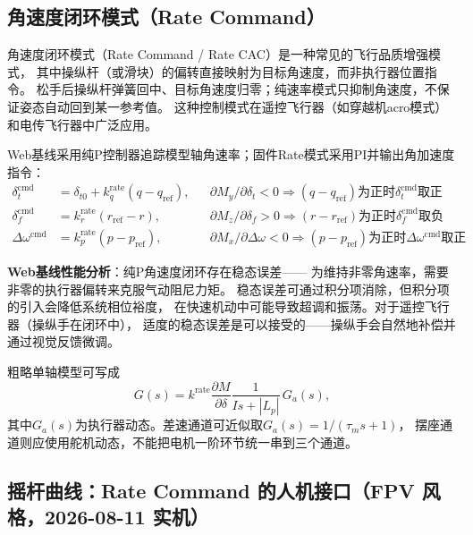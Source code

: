 \subsection{角速度闭环模式（Rate Command）}

角速度闭环模式（Rate Command / Rate CAC）是一种常见的飞行品质增强模式，
其中操纵杆（或滑块）的偏转直接映射为目标角速度，而非执行器位置指令。
松手后操纵杆弹簧回中、目标角速度归零；纯速率模式只抑制角速度，不保证姿态自动回到某一参考值。
这种控制模式在遥控飞行器（如穿越机acro模式）和电传飞行器中广泛应用。

Web基线采用纯P控制器追踪模型轴角速率；固件Rate模式采用PI并输出角加速度指令：
\begin{align}
    \delta_t^{\text{cmd}} &= \delta_{t0}+k_q^{\text{rate}} (q - q_{\text{ref}}),
    &&\partial M_y / \partial \delta_t < 0 \Rightarrow (q - q_{\text{ref}})
    \text{为正时} \delta_t^{\text{cmd}} \text{取正} \\
    \delta_f^{\text{cmd}} &= k_r^{\text{rate}} (r_{\text{ref}} - r),
    &&\partial M_z / \partial \delta_f > 0 \Rightarrow (r - r_{\text{ref}})
    \text{为正时} \delta_f^{\text{cmd}} \text{取负} \\
    \Delta\omega^{\text{cmd}} &= k_p^{\text{rate}} (p - p_{\text{ref}}),
    &&\partial M_x / \partial \Delta\omega < 0 \Rightarrow (p - p_{\text{ref}})
    \text{为正时} \Delta\omega^{\text{cmd}} \text{取正}
    \label{eq:rate_command}
\end{align}

\textbf{Web基线性能分析}：纯P角速度闭环存在稳态误差——
为维持非零角速率，需要非零的执行器偏转来克服气动阻尼力矩。
稳态误差可通过积分项消除，但积分项的引入会降低系统相位裕度，
在快速机动中可能导致超调和振荡。对于遥控飞行器（操纵手在闭环中），
适度的稳态误差是可以接受的——操纵手会自然地补偿并通过视觉反馈微调。

粗略单轴模型可写成
\begin{equation}
G(s)=k^{\mathrm{rate}}\frac{\partial M}{\partial\delta}
\frac{1}{Is+|L_p|}\,G_a(s),
\end{equation}
其中$G_a(s)$为执行器动态。差速通道可近似取$G_a(s)=1/(\tau_m s+1)$，
摆座通道则应使用舵机动态，不能把电机一阶环节统一串到三个通道。

\subsection{摇杆曲线：Rate Command 的人机接口（FPV 风格，2026-08-11 实机）}
\label{sec:rc_curve}

